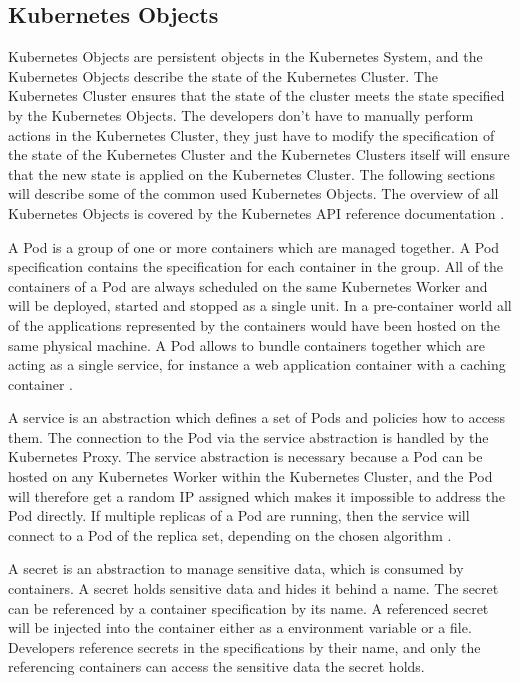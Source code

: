 \subsection{Kubernetes Objects}
\label{sec:caas-kubernetes-objects}
Kubernetes Objects are persistent objects in the Kubernetes System, and the Kubernetes Objects describe the state of the Kubernetes Cluster. The Kubernetes Cluster ensures that the state of the cluster meets the state specified by the Kubernetes Objects. The developers don't have to manually perform actions in the Kubernetes Cluster, they just have to modify the specification of the state of the Kubernetes Cluster and the Kubernetes Clusters itself will ensure that the new state is applied on the Kubernetes Cluster. The following sections will describe some of the common used Kubernetes Objects. The overview of all Kubernetes Objects is covered by the Kubernetes API reference documentation \cite{CNCFKubernetesAPI2018}. 

A Pod is a group of one or more containers which are managed together. A Pod specification contains the specification for each container in the group. All of the containers of a Pod are always scheduled on the same Kubernetes Worker and will be deployed, started and stopped as a single unit. In a pre-container world all of the applications represented by the containers would have been hosted on the same physical machine. A Pod allows to bundle containers together which are acting as a single service, for instance a web application container with a caching container \cite{CNCFKubernetesPods2018}. 

A service is an abstraction which defines a set of Pods and policies how to access them. The connection to the Pod via the service abstraction is handled by the Kubernetes Proxy. The service abstraction is necessary because a Pod can be hosted on any Kubernetes Worker within the Kubernetes Cluster,  and the Pod will therefore get a random IP assigned which makes it impossible to address the Pod directly. If multiple replicas of a Pod are running, then the service will connect to a Pod of the replica set, depending on the chosen algorithm \cite{CNCFKubernetesServices2018}.

A secret is an abstraction to manage sensitive data, which is consumed by containers. A secret holds sensitive data and hides it behind a name. The secret can be referenced by a container specification by its name. A referenced secret will be injected into the container either as a environment variable or a file. Developers reference secrets in the specifications by their name, and only the referencing containers can access the sensitive data the secret holds. 

